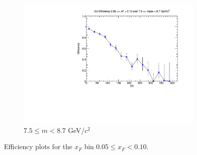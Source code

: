\begin{figure}[p]
\begin{subfigure}[b]{0.32\textwidth}
        \includegraphics[width=\textwidth]{./kTrackerEfficiencyPlots/D2_Efficiency_xF1_mass10.pdf}
        \caption{$7.5 \leq m < 8.7$ GeV/$c^2$}
        \label{fig:xF1_mass10}
    \end{subfigure}
    \hfill
    \caption{Efficiency plots for the $x_F$ bin $0.05 \leq x_F < 0.10$.}
    \label{fig:xF1}
\end{figure}

\clearpage

